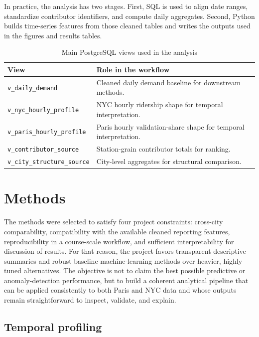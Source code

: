 \documentclass[10pt,twocolumn,a4paper]{article}
\begin{document}
In practice, the analysis has two stages. First, SQL is used to align date
ranges, standardize contributor identifiers, and compute daily aggregates.
Second, Python builds time-series features from those cleaned tables and writes
the outputs used in the figures and results tables.


\begin{table}[t]
\centering
\footnotesize
\caption{Main PostgreSQL views used in the analysis}
\begin{tabular}{@{}L{0.38\columnwidth}L{0.54\columnwidth}@{}}
\toprule
View & Role in the workflow \\
\midrule
\nolinkurl{v_daily_demand} & Cleaned daily demand baseline for downstream methods. \\
\nolinkurl{v_nyc_hourly_profile} & NYC hourly ridership shape for temporal interpretation. \\
\nolinkurl{v_paris_hourly_profile} & Paris hourly validation-share shape for temporal interpretation. \\
\nolinkurl{v_contributor_source} & Station-grain contributor totals for ranking. \\
\nolinkurl{v_city_structure_source} & City-level aggregates for structural comparison. \\
\bottomrule
\end{tabular}
\end{table}

\section{Methods}

The methods were selected to satisfy four project constraints: cross-city
comparability, compatibility with the available cleaned reporting features,
reproducibility in a course-scale workflow, and sufficient interpretability for
discussion of results. For that reason, the project favors transparent
descriptive summaries and robust baseline machine-learning methods over heavier,
highly tuned alternatives. The objective is not to claim the best possible
predictive or anomaly-detection performance, but to build a coherent analytical
pipeline that can be applied consistently to both Paris and NYC data and whose
outputs remain straightforward to inspect, validate, and explain.

\subsection{Temporal profiling}
\end{document}
